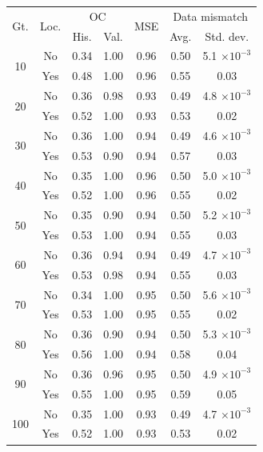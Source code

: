 \begin{tabular}{ccccccc}
\toprule
\multirow{2}{*}{
    Gt.
}
&
\multirow{2}{*}{Loc.} 
& 
\multicolumn{2}{c}{OC} & 
\multirow{2}{*}{
    MSE
} & 
\multicolumn{2}{c}{Data mismatch} 
\\
& & His. & Val. &  & Avg. & Std. dev.
\\
\midrule
\multirow{2}{*}{10} & No & 0.34 & 1.00 & 0.96 & 0.50 & 5.1 $\times 10^{-3}$ \\
 & Yes & 0.48 & 1.00 & 0.96 & 0.55 & 0.03 \\
\midrule
\multirow{2}{*}{20} & No & 0.36 & 0.98 & 0.93 & 0.49 & 4.8 $\times 10^{-3}$ \\
 & Yes & 0.52 & 1.00 & 0.93 & 0.53 & 0.02 \\
\midrule
\multirow{2}{*}{30} & No & 0.36 & 1.00 & 0.94 & 0.49 & 4.6 $\times 10^{-3}$ \\
 & Yes & 0.53 & 0.90 & 0.94 & 0.57 & 0.03 \\
\midrule
\multirow{2}{*}{40} & No & 0.35 & 1.00 & 0.96 & 0.50 & 5.0 $\times 10^{-3}$ \\
 & Yes & 0.52 & 1.00 & 0.96 & 0.55 & 0.02 \\
\midrule
\multirow{2}{*}{50} & No & 0.35 & 0.90 & 0.94 & 0.50 & 5.2 $\times 10^{-3}$ \\
 & Yes & 0.53 & 1.00 & 0.94 & 0.55 & 0.03 \\
\midrule
\multirow{2}{*}{60} & No & 0.36 & 0.94 & 0.94 & 0.49 & 4.7 $\times 10^{-3}$ \\
 & Yes & 0.53 & 0.98 & 0.94 & 0.55 & 0.03 \\
\midrule
\multirow{2}{*}{70} & No & 0.34 & 1.00 & 0.95 & 0.50 & 5.6 $\times 10^{-3}$ \\
 & Yes & 0.53 & 1.00 & 0.95 & 0.55 & 0.02 \\
\midrule
\multirow{2}{*}{80} & No & 0.36 & 0.90 & 0.94 & 0.50 & 5.3 $\times 10^{-3}$ \\
 & Yes & 0.56 & 1.00 & 0.94 & 0.58 & 0.04 \\
\midrule
\multirow{2}{*}{90} & No & 0.36 & 0.96 & 0.95 & 0.50 & 4.9 $\times 10^{-3}$ \\
 & Yes & 0.55 & 1.00 & 0.95 & 0.59 & 0.05 \\
\midrule
\multirow{2}{*}{100} & No & 0.35 & 1.00 & 0.93 & 0.49 & 4.7 $\times 10^{-3}$ \\
 & Yes & 0.52 & 1.00 & 0.93 & 0.53 & 0.02 \\
\bottomrule
\end{tabular}
